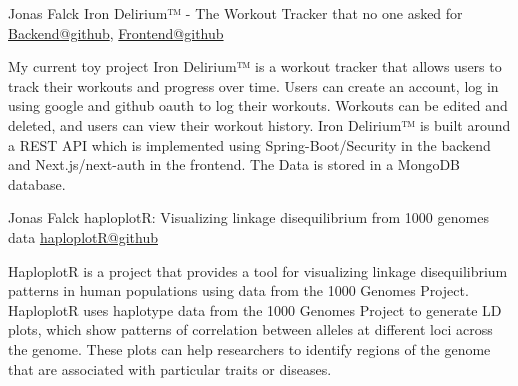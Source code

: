 

\begin{cventries}
  \cventry
  {Jonas Falck}
  {Iron Delirium™ - The Workout Tracker that no one asked for} %
  {
    \href{https://github.com/joe-nas/workout-app}{Backend@github},
  \href{https://github.com/joe-nas/workout-app-frontend-next}{Frontend@github}
  }
  {} %
  {    
  \begin{cvitems} %
    \item {My current toy project Iron Delirium™ is a workout tracker that allows users to track their workouts and progress over time. Users can create an account, log in using google and github oauth to log their workouts. Workouts can be edited and deleted, and users can view their workout history. Iron Delirium™ is built around a REST API which is implemented using Spring-Boot/Security in the backend and Next.js/next-auth in the frontend. The Data is stored in a MongoDB database.}
  \end{cvitems}
  }
  
\cventry
  {Jonas Falck}
  {haploplotR: Visualizing linkage disequilibrium from 1000 genomes data} %
  {\href{http://github.com/joe-nas/haploplotR}{haploplotR@github}} %
  {} %
  {    
  \begin{cvitems} %
    \item {HaploplotR is a project that provides a tool for visualizing linkage disequilibrium patterns in human populations using data from the 1000 Genomes Project. 
    HaploplotR uses haplotype data from the 1000 Genomes Project to generate LD plots, which show patterns of correlation between alleles at different loci across the genome. 
    These plots can help researchers to identify regions of the genome that are associated with particular traits or diseases.}
  \end{cvitems}
  }

  

\end{cventries}